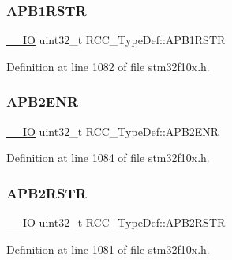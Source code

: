 \subsubsection{\texorpdfstring{A\+P\+B1\+R\+S\+TR}{APB1RSTR}}
{\footnotesize\ttfamily \hyperlink{core__sc300_8h_aec43007d9998a0a0e01faede4133d6be}{\+\_\+\+\_\+\+IO} uint32\+\_\+t R\+C\+C\+\_\+\+Type\+Def\+::\+A\+P\+B1\+R\+S\+TR}



Definition at line 1082 of file stm32f10x.\+h.

\mbox{\label{struct_r_c_c___type_def_a619b4c22f630a269dfd0c331f90f6868}} 
\subsubsection{\texorpdfstring{A\+P\+B2\+E\+NR}{APB2ENR}}
{\footnotesize\ttfamily \hyperlink{core__sc300_8h_aec43007d9998a0a0e01faede4133d6be}{\+\_\+\+\_\+\+IO} uint32\+\_\+t R\+C\+C\+\_\+\+Type\+Def\+::\+A\+P\+B2\+E\+NR}



Definition at line 1084 of file stm32f10x.\+h.

\mbox{\label{struct_r_c_c___type_def_a4491ab20a44b70bf7abd247791676a59}} 
\subsubsection{\texorpdfstring{A\+P\+B2\+R\+S\+TR}{APB2RSTR}}
{\footnotesize\ttfamily \hyperlink{core__sc300_8h_aec43007d9998a0a0e01faede4133d6be}{\+\_\+\+\_\+\+IO} uint32\+\_\+t R\+C\+C\+\_\+\+Type\+Def\+::\+A\+P\+B2\+R\+S\+TR}



Definition at line 1081 of file stm32f10x.\+h.

\mbox{\label{struct_r_c_c___type_def_a05be375db50e8c9dd24fb3bcf42d7cf1}} 
